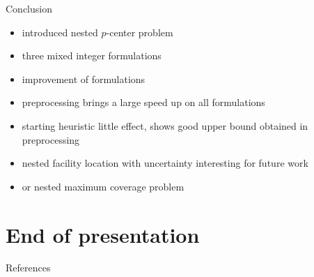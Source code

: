 \documentclass[utf8,aspectratio=1610,ngerman,english]{beamer}
\newcommand{\nPC}{\hyperref[eq:nPC]{\texttt{(nPC1)}}\xspace}
\newcommand{\nPCE}{\hyperref[eq:nPCE]{\texttt{(nPC3)}}\xspace}
\newcommand{\nPCY}{\hyperref[eq:nPCY]{\texttt{(nPC2)}}\xspace}
\begin{document}
\begin{frame}{Conclusion}
    \begin{itemize}
        \item introduced nested $p$-center problem
        \item three mixed integer formulations
        \item improvement of formulations
        \item preprocessing brings a large speed up on all formulations
        \item starting heuristic little effect, shows good upper bound obtained in preprocessing
        \item nested facility location with uncertainty interesting for future work
        \item or nested maximum coverage problem
    \end{itemize}
\end{frame}


\maketitle

\section*{End of presentation}


\begin{frame}[allowframebreaks]{References}
    \printbibliography
\end{frame}
\end{document}
